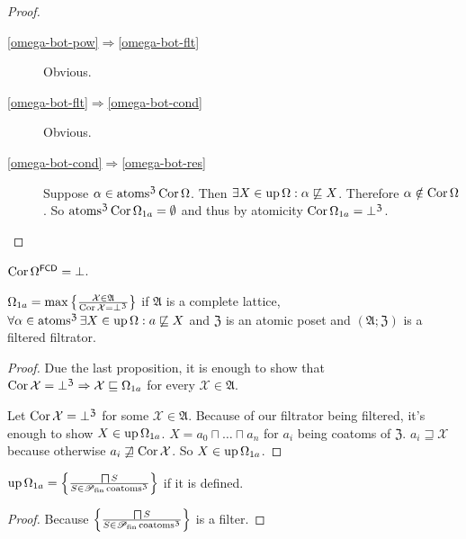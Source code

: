 \begin{proof}
~
\begin{description}
\item[\ref{omega-bot-pow}$\Rightarrow$\ref{omega-bot-flt}]
  Obvious.
\item[\ref{omega-bot-flt}$\Rightarrow$\ref{omega-bot-cond}]
  Obvious.
\item[\ref{omega-bot-cond}$\Rightarrow$\ref{omega-bot-res}]
  Suppose $\alpha \in \operatorname{atoms}^{\mathfrak{Z}} \operatorname{Cor} \Omega$. Then
  $\exists X \in \operatorname{up} \Omega : \alpha \not\sqsubseteq X$.
  Therefore $\alpha \notin \operatorname{Cor} \Omega$. So $\operatorname{atoms}^{\mathfrak{Z}}
  \operatorname{Cor} \Omega_{1 a} = \emptyset$ and thus by atomicity $\operatorname{Cor}
  \Omega_{1 a} = \bot^{\mathfrak{Z}}$.
\end{description}
\end{proof}

\begin{cor}
  $\operatorname{Cor} \Omega^{\mathsf{FCD}} = \bot$.
\end{cor}

\begin{prop}
  $\Omega_{1 a} = \max \left\{ \frac{ \mathcal{X} \in \mathfrak{A} }{
  \operatorname{Cor} \mathcal{X} = \bot^{\mathfrak{Z}} }\right\}$ if $\mathfrak{A}$ is
  a complete lattice,
  $\forall \alpha \in \operatorname{atoms}^{\mathfrak{Z}} \exists X \in \operatorname{up}
  \Omega : a \not\sqsubseteq X$ and $\mathfrak{Z}$ is an atomic
  poset and $(\mathfrak{A}; \mathfrak{Z})$ is a filtered filtrator.
\end{prop}

\begin{proof}
  Due the last proposition, it is enough to show that $\operatorname{Cor} \mathcal{X}
  = \bot^{\mathfrak{Z}} \Rightarrow \mathcal{X} \sqsubseteq \Omega_{1 a}$ for
  every $\mathcal{X} \in \mathfrak{A}$.
  
  Let $\operatorname{Cor} \mathcal{X} = \bot^{\mathfrak{Z}}$ for some $\mathcal{X} \in
  \mathfrak{A}$. Because of our filtrator being filtered, it's enough to show
  $X \in \operatorname{up} \Omega_{1 a}$. $X = a_0 \sqcap \ldots \sqcap a_n$ for $a_i$
  being coatoms of $\mathfrak{Z}$. $a_i \sqsupseteq \mathcal{X}$ because
  otherwise $a_i \not\sqsupseteq \operatorname{Cor} \mathcal{X}$. So $X
  \in \operatorname{up} \Omega_{1 a}$.
\end{proof}

\begin{prop}
  $\operatorname{up} \Omega_{1a} = \left\{ \frac{ \bigsqcap S }{ S \in
  \mathscr{P}_{\operatorname{fin}} \operatorname{coatoms}^{\mathfrak{Z}} }\right\}$
  if it is defined.
\end{prop}

\begin{proof}
  Because $\left\{ \frac{ \bigsqcap S }{ S \in
  \mathscr{P}_{\operatorname{fin}} \operatorname{coatoms}^{\mathfrak{Z}} }\right\}$ is a
  filter.
\end{proof}

